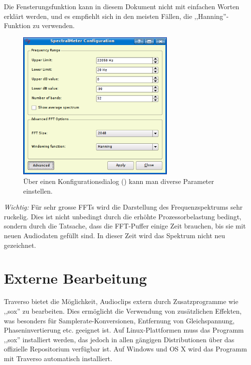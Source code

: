 Die Fensterungsfunktion kann in diesem Dokument nicht mit einfachen Worten erklärt werden, und es empfiehlt sich in den meisten Fällen, die ,,Hanning''-Funktion zu verwenden.

\begin{figure}
	\centering
	\includegraphics[width=0.7\textwidth]{../images/fft3}
	\caption{Über einen Konfigurationsdialog () kann man diverse Parameter einstellen.}
	\label{fig_fft3}
\end{figure}

\emph{Wichtig:} Für sehr grosse FFTs wird die Darstellung des Frequenzspektrums sehr ruckelig. Dies ist nicht unbedingt durch die erhöhte Prozessorbelastung bedingt, sondern durch die Tatsache, dass die FFT-Puffer einige Zeit brauchen, bis sie mit neuen Audiodaten gefüllt sind. In dieser Zeit wird das Spektrum nicht neu gezeichnet.

\section{Externe Bearbeitung}
Traverso bietet die Möglichkeit, Audioclips extern durch Zusatzprogramme wie ,,sox'' \cite{sox} zu bearbeiten. Dies ermöglicht die Verwendung von zusätzlichen Effekten, was besonders für Samplerate-Konversionen, Entfernung von Gleichspannung, Phaseninvertierung etc. geeignet ist. Auf Linux-Plattformen muss das Programm ,,sox'' installiert werden, das jedoch in allen gängigen Distributionen über das offizielle Repositorium verfügbar ist. Auf Windows und OS X wird das Programm mit Traverso automatisch installiert.

